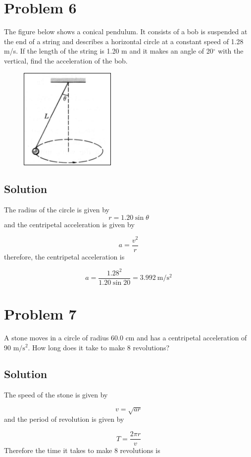 \documentclass{article}
\begin{document}
\section*{Problem 6}
The figure below shows a conical pendulum. It consists of a bob is suspended at the end of a
string and describes a horizontal circle at a constant speed of 1.28 m/s. If the length of the
string is 1.20 m and it makes an angle of 20$^\circ$ with the vertical, find the acceleration of the bob.

\begin{figure}[ht]
    \centering
    \includegraphics[scale=.5]{drawing-1.png}
\end{figure}

\subsection*{Solution}
The radius of the circle is given by
\[
	r = 1.20 \sin \theta
\]
and the centripetal acceleration is given by

\[
	a = \frac{v^2}{r}
\]
therefore, the centripetal acceleration is

\[
	a = \frac{1.28^2}{1.20 \sin 20} = \boxed{3.992\ \text{m}/\text{s}^2}
\]

\section*{Problem 7}
A stone moves in a circle of radius 60.0 cm and has a centripetal acceleration of 90 $\text{m}/\text{s}^2$. How
long does it take to make 8 revolutions?

\subsection*{Solution}
The speed of the stone is given by

\[
	v = \sqrt{ar}
\]
and the period of revolution is given by

\[
	T = \frac{2 \pi r}{v}
\]
Therefore the time it takes to make 8 revolutions is
\end{document}
